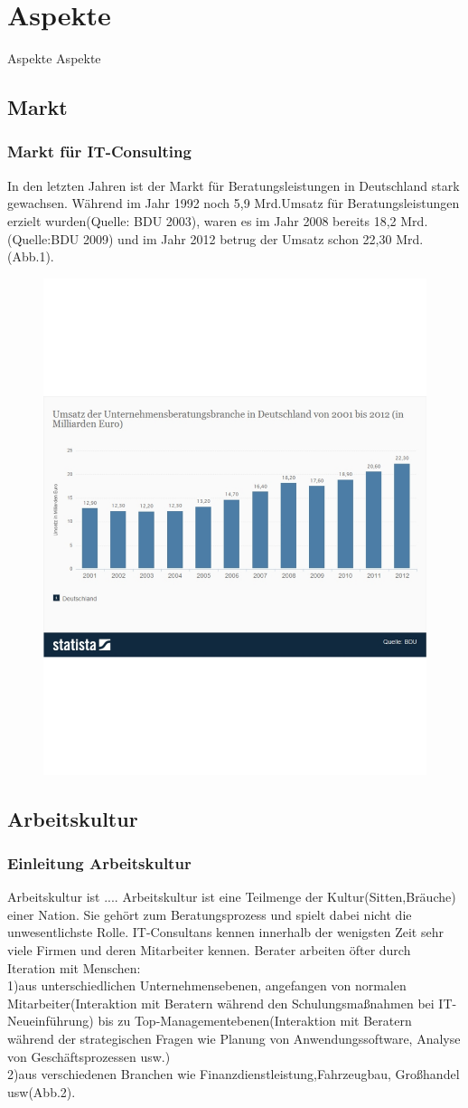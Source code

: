\chapter{Aspekte}
Aspekte Aspekte
\section{Markt}
	\subsection{Markt für IT-Consulting}
	In den letzten Jahren ist der Markt für Beratungsleistungen in Deutschland stark gewachsen. Während im Jahr 1992 noch 5,9 Mrd.\texteuro Umsatz für Beratungsleistungen erzielt wurden(Quelle: BDU 2003), waren es im Jahr 2008 bereits 18,2 Mrd. \texteuro (Quelle:BDU 2009) und im Jahr 2012 betrug der Umsatz schon 22,30 Mrd. \texteuro (Abb.1).
\begin{figure}[htp]
\centering
\includegraphics[width=7 cm]{images/UmsatzUBeratungsbrancheDeutschland.pdf}
\end{figure}
\section{Arbeitskultur}
	\subsection{Einleitung Arbeitskultur}
Arbeitskultur ist ....
Arbeitskultur ist eine Teilmenge der Kultur(Sitten,Bräuche) einer Nation. Sie gehört zum Beratungsprozess und spielt dabei nicht die unwesentlichste Rolle. IT-Consultans kennen innerhalb der wenigsten Zeit sehr viele Firmen und deren Mitarbeiter kennen. Berater arbeiten öfter durch Iteration mit Menschen:\\
1)aus unterschiedlichen Unternehmensebenen, angefangen von normalen Mitarbeiter(Interaktion mit Beratern während den Schulungsmaßnahmen bei IT-Neueinführung) bis zu Top-Managementebenen(Interaktion mit Beratern während der strategischen Fragen wie Planung von Anwendungssoftware, Analyse von Geschäftsprozessen usw.)\\
2)aus verschiedenen Branchen wie Finanzdienstleistung,Fahrzeugbau, Großhandel usw(Abb.2).

